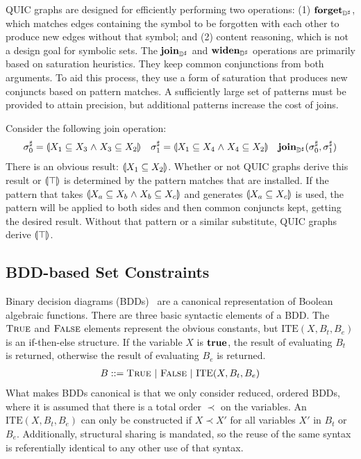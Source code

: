 QUIC graphs are designed for efficiently performing two operations:
(1) $\textbf{forget}_{{\mathbb{D}}^{\sharp}}$, which matches edges containing the symbol to be
forgotten with each other to produce new edges without that symbol; and
(2) content reasoning, which is not a design goal for symbolic sets.
The $\textbf{join}_{{\mathbb{D}}^{\sharp}}$ and $\textbf{widen}_{{\mathbb{D}}^{\sharp}}$ operations are primarily based on
saturation heuristics.
They keep common conjunctions from both arguments.
To aid this process, they use a form of saturation that produces new
conjuncts based on pattern matches.
A sufficiently large set of patterns must be provided to attain precision,
but additional patterns increase the cost of joins.
\begin{example} \label{ex:Qjoin}  Consider the following join operation:
    \begin{align*}
      {\sigma}^{\sharp}_0 &= \llparenthesis X_1 \subseteq X_3 \mathrel{\wedge} X_3 \subseteq X_2 \rrparenthesis &
      {\sigma}^{\sharp}_1 &= \llparenthesis X_1 \subseteq X_4 \mathrel{\wedge} X_4 \subseteq X_2 \rrparenthesis &
      \textbf{join}_{{\mathbb{D}}^{\sharp}}({\sigma}^{\sharp}_0, {\sigma}^{\sharp}_1 )
    \end{align*}
    There is an obvious result: $\llparenthesis X_1 \subseteq X_2 \rrparenthesis$.  Whether or not QUIC graphs derive this result or $\llparenthesis \top \rrparenthesis$ is determined by the pattern matches that are installed.  If the pattern that takes $\llparenthesis X_a \subseteq X_b \mathrel{\wedge} X_b \subseteq X_c \rrparenthesis$ and generates $\llparenthesis X_a \subseteq X_c \rrparenthesis$ is used, the pattern will be applied to both sides and then common conjuncts kept, getting the desired result.  Without that pattern or a similar substitute, QUIC graphs derive $\llparenthesis \top \rrparenthesis$.
\end{example}

\subsection{BDD-based Set Constraints}
\label{s:4:3:bdd}
Binary decision diagrams (BDDs)~\cite{bdd:trans:86} are a canonical representation of Boolean algebraic functions.  There are three basic syntactic elements of a BDD.  The $\textsc{True}$ and $\textsc{False}$ elements represent the obvious constants, but $\textrm{ITE}(X,B_t,B_e)$ is an if-then-else structure.  If the variable $X$ is $\mathbf{true}$, the result of evaluating $B_t$ is returned, otherwise the result of evaluating $B_e$ is returned.
\begin{align*}
  B ::= \textsc{True} \ | \ \textsc{False} \ | \ \textrm{ITE}(X,B_t,B_e)
\end{align*}
What makes BDDs canonical is that we only consider reduced, ordered BDDs, where it is assumed that there is a total order $\prec$ on the variables.  An $\textrm{ITE}(X,B_t,B_e)$ can only be constructed if $X \prec X'$ for all variables $X'$ in $B_t$ or $B_e$.  Additionally, structural sharing is mandated, so the reuse of the same syntax is referentially identical to any other use of that syntax.

